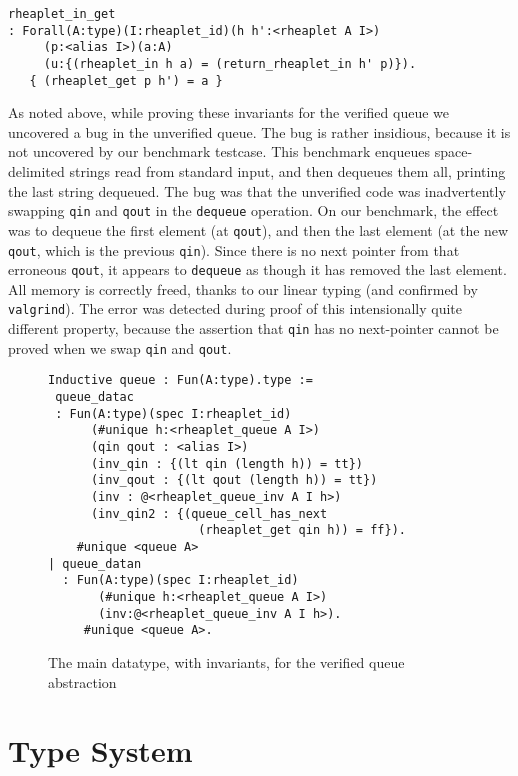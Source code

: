 \documentclass[9pt,natbib]{sigplanconf}
\begin{document}
{\small
\begin{verbatim}
rheaplet_in_get
: Forall(A:type)(I:rheaplet_id)(h h':<rheaplet A I>)
     (p:<alias I>)(a:A)
     (u:{(rheaplet_in h a) = (return_rheaplet_in h' p)}).
   { (rheaplet_get p h') = a }
\end{verbatim}
}
  
As noted above, while proving these invariants for the verified queue
we uncovered a bug in the unverified queue.  The bug is rather
insidious, because it is not uncovered by our benchmark testcase.
This benchmark enqueues space-delimited strings read from standard
input, and then dequeues them all, printing the last string dequeued.
The bug was that the unverified code was inadvertently swapping
\texttt{qin} and \texttt{qout} in the \texttt{dequeue} operation.  On
our benchmark, the effect was to dequeue the first element (at
\texttt{qout}), and then the last element (at the new \texttt{qout},
which is the previous \texttt{qin}).  Since there is no next pointer
from that erroneous \texttt{qout}, it appears to \texttt{dequeue} as
though it has removed the last element.  All memory is correctly
freed, thanks to our linear typing (and confirmed by
\texttt{valgrind}).  The error was detected during proof of this
intensionally quite different property, because the assertion that
\texttt{qin} has no next-pointer cannot be proved when we swap
\texttt{qin} and \texttt{qout}.

\begin{figure}
\begin{verbatim}
Inductive queue : Fun(A:type).type :=
 queue_datac
 : Fun(A:type)(spec I:rheaplet_id)
      (#unique h:<rheaplet_queue A I>)
      (qin qout : <alias I>)
      (inv_qin : {(lt qin (length h)) = tt})
      (inv_qout : {(lt qout (length h)) = tt})
      (inv : @<rheaplet_queue_inv A I h>)
      (inv_qin2 : {(queue_cell_has_next
                     (rheaplet_get qin h)) = ff}).
    #unique <queue A>
| queue_datan
  : Fun(A:type)(spec I:rheaplet_id)
       (#unique h:<rheaplet_queue A I>)
       (inv:@<rheaplet_queue_inv A I h>).
     #unique <queue A>.
\end{verbatim}
\label{fig:queue2}
\caption{The main datatype, with invariants, for the verified queue abstraction}
\end{figure}

\section{Type System}
\end{document}
